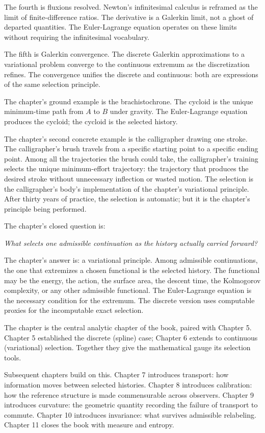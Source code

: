 \begin{chapteressay}
The fourth is fluxions resolved. Newton's infinitesimal calculus
is reframed as the limit of finite-difference ratios. The
derivative is a Galerkin limit, not a ghost of departed
quantities. The Euler-Lagrange equation operates on these
limits without requiring the infinitesimal vocabulary.

The fifth is Galerkin convergence. The discrete Galerkin
approximations to a variational problem converge to the
continuous extremum as the discretization refines. The
convergence unifies the discrete and continuous: both are
expressions of the same selection principle.

The chapter's ground example is the brachistochrone. The cycloid
is the unique minimum-time path from $A$ to $B$ under gravity.
The Euler-Lagrange equation produces the cycloid; the cycloid is
the selected history.

The chapter's second concrete example is the calligrapher
drawing one stroke. The calligrapher's brush travels from a
specific starting point to a specific ending point. Among all
the trajectories the brush could take, the calligrapher's
training selects the unique minimum-effort trajectory: the
trajectory that produces the desired stroke without
unnecessary inflection or wasted motion. The selection is the
calligrapher's body's implementation of the chapter's
variational principle. After thirty years of practice, the
selection is automatic; but it is the chapter's principle being
performed.

The chapter's closed question is:

\begin{center}
\emph{What selects one admissible continuation as the history
actually carried forward?}
\end{center}

The chapter's answer is: a variational principle. Among
admissible continuations, the one that extremizes a chosen
functional is the selected history. The functional may be the
energy, the action, the surface area, the descent time, the
Kolmogorov complexity, or any other admissible functional. The
Euler-Lagrange equation is the necessary condition for the
extremum. The discrete version uses computable proxies for the
incomputable exact selection.

The chapter is the central analytic chapter of the book, paired
with Chapter 5. Chapter 5 established the discrete (spline)
case; Chapter 6 extends to continuous (variational) selection.
Together they give the mathematical gauge its selection tools.

Subsequent chapters build on this. Chapter 7 introduces
transport: how information moves between selected histories.
Chapter 8 introduces calibration: how the reference structure is
made commensurable across observers. Chapter 9 introduces
curvature: the geometric quantity recording the failure of
transport to commute. Chapter 10 introduces invariance: what
survives admissible relabeling. Chapter 11 closes the book with
measure and entropy.

\end{chapteressay}

